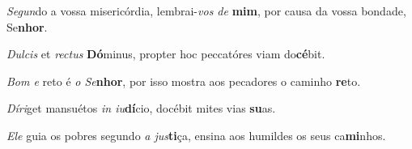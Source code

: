 \begin{greenumerate}
  \switchcolumn%

  \item \textit{Segun}do a vossa misericórdia, lembrai-\textit{vos de} \textbf{mim}, {\GreStar} por causa da vossa bondade, Se\-\textbf{nhor}. 

  \switchcolumn*


  \item \textit{Dulcis} et \textit{rectus} \textbf{Dó}minus, {\GreStar} propter hoc peccatóres viam do\textbf{cé}bit. 

  \switchcolumn%

  \item \textit{Bom e} reto é \textit{o Se}\textbf{nhor}, {\GreStar} por isso mostra aos pecadores o caminho \textbf{re}to. 

  \switchcolumn*


  \item \textit{Díri}get mansuétos \textit{in iu}\textbf{dí}cio, {\GreStar} docébit mites vias \textbf{su}as. 

  \switchcolumn%

  \item \textit{Ele} guia os pobres segundo \textit{a jus}\textbf{ti}ça, {\GreStar} ensina aos humildes os seus ca\textbf{mi}nhos. 
\end{greenumerate}